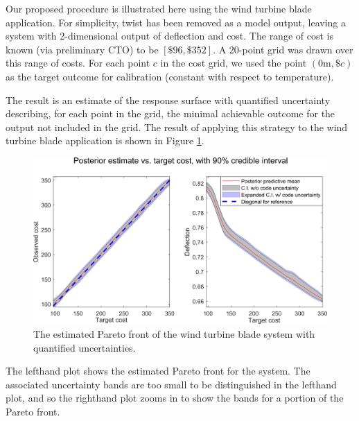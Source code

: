 \documentclass[twocolumn,10pt]{asme2ej}
\begin{document}
%
Our proposed procedure is illustrated here using the wind turbine blade application.
%
For simplicity, twist has been removed as a model output, leaving a system with 2-dimensional output of deflection and cost. 
%
The range of cost is known (via preliminary CTO) to be $[\$96,\$352]$.
%
A 20-point grid was drawn over this range of costs. 
%
%
For each point $c$ in the cost grid, we used the point $(0\mathrm m,\$c)$ as the target outcome for calibration (constant with respect to temperature).
%

%
The result is an estimate of the response surface with quantified uncertainty describing, for each point in the grid, the minimal achievable outcome for the output not included in the grid.
%
%
%
The result of applying this strategy to the wind turbine blade application is shown in Figure \ref{fig:known_cost}. 
%
\begin{figure}[h]
	\centering
	\includegraphics[scale=.85]{FIG_cost_grid_pareto_bands}
	\caption{The estimated Pareto front of the wind turbine blade system with quantified uncertainties.}
	\label{fig:known_cost}
\end{figure}
%
The lefthand plot shows the estimated Pareto front for the system.
%
The associated uncertainty bands are too small to be distinguished in the lefthand plot, and so the righthand plot zooms in to show the bands for a portion of the Pareto front.
%
%
%
\end{document}
